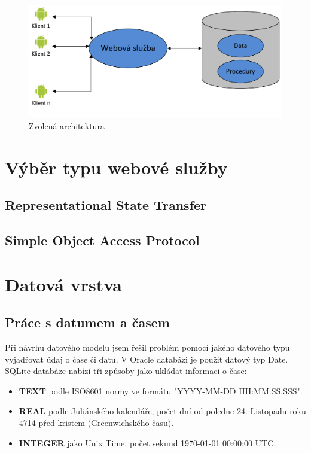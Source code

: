 \documentclass{bakalarka}
\begin{document}
\begin{figure}[H]
  \centering
  \includegraphics[scale=0.8]{obr/souc_arch2.pdf}
\caption{Zvolená architektura}
\label{obr:arch}
\end{figure}

\section{Výběr typu webové služby}

\subsection{Representational State Transfer}

\subsection{Simple Object Access Protocol}

\section{Datová vrstva}
\subsection{Práce s datumem a časem}
Při návrhu datového modelu jsem řešil problém pomocí jakého datového typu vyjadřovat údaj o čase či datu. V Oracle databázi je použit datový typ Date. SQLite databáze nabízí tři způsoby jako ukládat informaci o čase:
\begin{itemize}
\item \textbf{TEXT} podle ISO8601 normy ve formátu "YYYY-MM-DD HH:MM:SS.SSS".
\item \textbf{REAL} podle Juliánského kalendáře, počet dní od poledne 24. Listopadu roku 4714 před kristem (Greenwichského času).
\item \textbf{INTEGER} jako Unix Time, počet sekund 1970-01-01 00:00:00 UTC.
\end{itemize}
\end{document}
